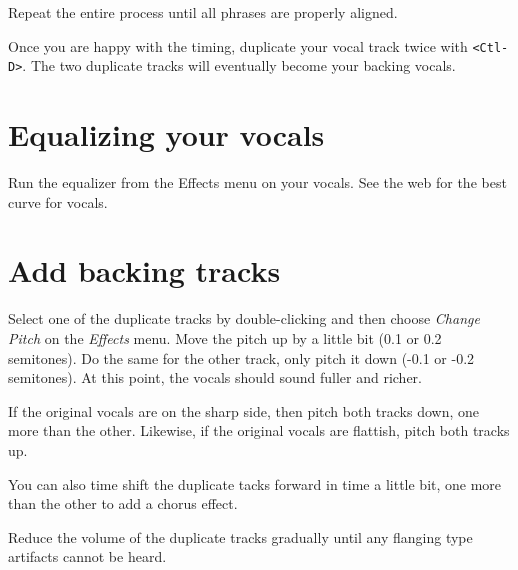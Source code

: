 \documentclass{article}
\begin{document}
Repeat the entire process until all phrases are properly aligned.

Once you are happy with the timing,
duplicate your vocal track twice with
\verb!<Ctl-D>!. The two duplicate tracks will eventually become
your backing vocals.

\section*{Equalizing your vocals}

Run the equalizer from the Effects menu on your vocals. See the web for the
best curve for vocals.

\section*{Add backing tracks}

Select one of the duplicate tracks by double-clicking and then choose
{\it Change Pitch} on the {\it Effects} menu. 
Move the pitch up by a little bit (0.1 or 0.2 semitones). Do the same
for the other track, only pitch it down (-0.1 or -0.2 semitones).
At this point, the vocals should sound fuller and richer.

If the original vocals are on the sharp side, then pitch both tracks down,
one more than the other. Likewise, if the original vocals are flattish, pitch
both tracks up.

You can also time shift the duplicate tacks forward in time a little bit,
one more than the other to add a chorus effect.

Reduce the volume of the duplicate tracks gradually until any flanging
type artifacts cannot be heard.
\end{document}
